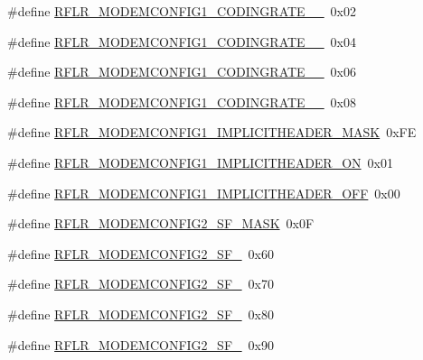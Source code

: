 \begin{DoxyCompactItemize}
\item 
\#define \mbox{\hyperlink{sx1276_regs-_lo_ra_8h_aa7c27ea8d7dbd73e49c8516a1fce494e}{R\+F\+L\+R\+\_\+\+M\+O\+D\+E\+M\+C\+O\+N\+F\+I\+G1\+\_\+\+C\+O\+D\+I\+N\+G\+R\+A\+T\+E\+\_\+\_}}~0x02
\item 
\#define \mbox{\hyperlink{sx1276_regs-_lo_ra_8h_ac6c7a7836d0806b3c807f4e13a72d474}{R\+F\+L\+R\+\_\+\+M\+O\+D\+E\+M\+C\+O\+N\+F\+I\+G1\+\_\+\+C\+O\+D\+I\+N\+G\+R\+A\+T\+E\+\_\+\_}}~0x04
\item 
\#define \mbox{\hyperlink{sx1276_regs-_lo_ra_8h_abb6c4f6b2967084666cb7f4a3afdbfc0}{R\+F\+L\+R\+\_\+\+M\+O\+D\+E\+M\+C\+O\+N\+F\+I\+G1\+\_\+\+C\+O\+D\+I\+N\+G\+R\+A\+T\+E\+\_\+\_}}~0x06
\item 
\#define \mbox{\hyperlink{sx1276_regs-_lo_ra_8h_a48839c3cc11bc39faef3b944b148e5c4}{R\+F\+L\+R\+\_\+\+M\+O\+D\+E\+M\+C\+O\+N\+F\+I\+G1\+\_\+\+C\+O\+D\+I\+N\+G\+R\+A\+T\+E\+\_\+\_}}~0x08
\item 
\#define \mbox{\hyperlink{sx1276_regs-_lo_ra_8h_a5c3e8f169b7fd6a7c8c064f00aca22b5}{R\+F\+L\+R\+\_\+\+M\+O\+D\+E\+M\+C\+O\+N\+F\+I\+G1\+\_\+\+I\+M\+P\+L\+I\+C\+I\+T\+H\+E\+A\+D\+E\+R\+\_\+\+M\+A\+SK}}~0x\+FE
\item 
\#define \mbox{\hyperlink{sx1276_regs-_lo_ra_8h_abebb6a657cfb5c28ed1e40efaf65d41b}{R\+F\+L\+R\+\_\+\+M\+O\+D\+E\+M\+C\+O\+N\+F\+I\+G1\+\_\+\+I\+M\+P\+L\+I\+C\+I\+T\+H\+E\+A\+D\+E\+R\+\_\+\+ON}}~0x01
\item 
\#define \mbox{\hyperlink{sx1276_regs-_lo_ra_8h_ab556742d1ecaced47aa63acbb5f52500}{R\+F\+L\+R\+\_\+\+M\+O\+D\+E\+M\+C\+O\+N\+F\+I\+G1\+\_\+\+I\+M\+P\+L\+I\+C\+I\+T\+H\+E\+A\+D\+E\+R\+\_\+\+O\+FF}}~0x00
\item 
\#define \mbox{\hyperlink{sx1276_regs-_lo_ra_8h_ac76e1fabdc6072d4f6110c17b1b6d34d}{R\+F\+L\+R\+\_\+\+M\+O\+D\+E\+M\+C\+O\+N\+F\+I\+G2\+\_\+\+S\+F\+\_\+\+M\+A\+SK}}~0x0F
\item 
\#define \mbox{\hyperlink{sx1276_regs-_lo_ra_8h_a79aea3587de0d6b3d509ffb74c68cf52}{R\+F\+L\+R\+\_\+\+M\+O\+D\+E\+M\+C\+O\+N\+F\+I\+G2\+\_\+\+S\+F\+\_}}~0x60
\item 
\#define \mbox{\hyperlink{sx1276_regs-_lo_ra_8h_acc46f8d414149e44dd110e4839277386}{R\+F\+L\+R\+\_\+\+M\+O\+D\+E\+M\+C\+O\+N\+F\+I\+G2\+\_\+\+S\+F\+\_}}~0x70
\item 
\#define \mbox{\hyperlink{sx1276_regs-_lo_ra_8h_a68793443cf8e71888053c9b20b1e39b5}{R\+F\+L\+R\+\_\+\+M\+O\+D\+E\+M\+C\+O\+N\+F\+I\+G2\+\_\+\+S\+F\+\_}}~0x80
\item 
\#define \mbox{\hyperlink{sx1276_regs-_lo_ra_8h_aa08790a707957dd4af566cb0c8d85299}{R\+F\+L\+R\+\_\+\+M\+O\+D\+E\+M\+C\+O\+N\+F\+I\+G2\+\_\+\+S\+F\+\_}}~0x90

\end{DoxyCompactItemize}
